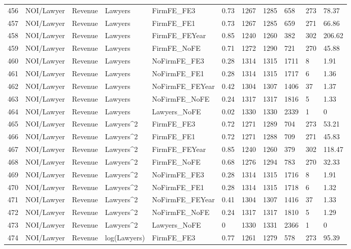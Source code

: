 \begin{table}[ht]
\begin{tabular}{rllllllllll}
  456 & NOI/Lawyer & Revenue & Lawyers & FirmFE\_FE3 & 0.73 & 1267 & 1285 & 658 & 273 & 78.37 \\ 
  457 & NOI/Lawyer & Revenue & Lawyers & FirmFE\_FE1 & 0.73 & 1267 & 1285 & 659 & 271 & 66.86 \\ 
  458 & NOI/Lawyer & Revenue & Lawyers & FirmFE\_FEYear & 0.85 & 1240 & 1260 & 382 & 302 & 206.62 \\ 
  459 & NOI/Lawyer & Revenue & Lawyers & FirmFE\_NoFE & 0.71 & 1272 & 1290 & 721 & 270 & 45.88 \\ 
  460 & NOI/Lawyer & Revenue & Lawyers & NoFirmFE\_FE3 & 0.28 & 1314 & 1315 & 1711 & 8 & 1.91 \\ 
  461 & NOI/Lawyer & Revenue & Lawyers & NoFirmFE\_FE1 & 0.28 & 1314 & 1315 & 1717 & 6 & 1.36 \\ 
  462 & NOI/Lawyer & Revenue & Lawyers & NoFirmFE\_FEYear & 0.42 & 1304 & 1307 & 1406 & 37 & 1.37 \\ 
  463 & NOI/Lawyer & Revenue & Lawyers & NoFirmFE\_NoFE & 0.24 & 1317 & 1317 & 1816 & 5 & 1.33 \\ 
  464 & NOI/Lawyer & Revenue & Lawyers & Lawyers\_NoFE & 0.02 & 1330 & 1330 & 2339 & 1 & 0 \\ 
  465 & NOI/Lawyer & Revenue & Lawyers^2 & FirmFE\_FE3 & 0.72 & 1271 & 1289 & 704 & 273 & 53.21 \\ 
  466 & NOI/Lawyer & Revenue & Lawyers^2 & FirmFE\_FE1 & 0.72 & 1271 & 1288 & 709 & 271 & 45.83 \\ 
  467 & NOI/Lawyer & Revenue & Lawyers^2 & FirmFE\_FEYear & 0.85 & 1240 & 1260 & 379 & 302 & 118.47 \\ 
  468 & NOI/Lawyer & Revenue & Lawyers^2 & FirmFE\_NoFE & 0.68 & 1276 & 1294 & 783 & 270 & 32.33 \\ 
  469 & NOI/Lawyer & Revenue & Lawyers^2 & NoFirmFE\_FE3 & 0.28 & 1314 & 1315 & 1716 & 8 & 1.91 \\ 
  470 & NOI/Lawyer & Revenue & Lawyers^2 & NoFirmFE\_FE1 & 0.28 & 1314 & 1315 & 1718 & 6 & 1.32 \\ 
  471 & NOI/Lawyer & Revenue & Lawyers^2 & NoFirmFE\_FEYear & 0.41 & 1304 & 1307 & 1416 & 37 & 1.33 \\ 
  472 & NOI/Lawyer & Revenue & Lawyers^2 & NoFirmFE\_NoFE & 0.24 & 1317 & 1317 & 1810 & 5 & 1.29 \\ 
  473 & NOI/Lawyer & Revenue & Lawyers^2 & Lawyers\_NoFE & 0 & 1330 & 1331 & 2366 & 1 & 0 \\ 
  474 & NOI/Lawyer & Revenue & log(Lawyers) & FirmFE\_FE3 & 0.77 & 1261 & 1279 & 578 & 273 & 95.39 \\ 

\end{tabular}
\end{table}
